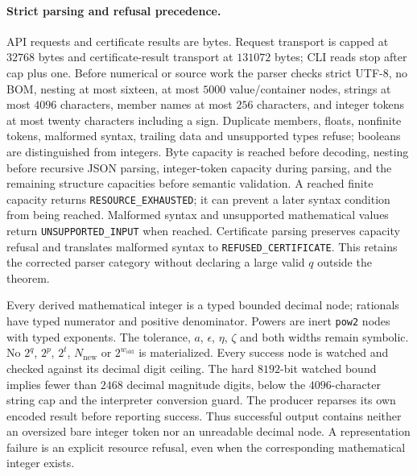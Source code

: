 \documentclass[11pt]{article}
\theoremstyle{plain}
\theoremstyle{definition}
\theoremstyle{remark}
\begin{document}
\paragraph{Strict parsing and refusal precedence.}
API requests and certificate results are bytes. Request transport is capped
at $32768$ bytes and certificate-result transport at $131072$ bytes; CLI
reads stop after cap plus one. Before numerical or source work the parser
checks strict UTF-8, no BOM, nesting at most sixteen, at most $5000$
value/container nodes, strings at most $4096$ characters, member names at
most $256$ characters, and integer tokens at most twenty characters including
a sign. Duplicate members, floats, nonfinite tokens, malformed syntax,
trailing data and unsupported types refuse; booleans are distinguished from
integers. Byte capacity is reached before decoding, nesting before recursive
JSON parsing, integer-token capacity during parsing, and the remaining
structure capacities before semantic validation. A reached finite capacity
returns \texttt{RESOURCE\_EXHAUSTED}; it can prevent a later syntax condition
from being reached. Malformed syntax and unsupported mathematical values
return \texttt{UNSUPPORTED\_INPUT} when reached. Certificate parsing preserves
capacity refusal and translates malformed syntax to
\texttt{REFUSED\_CERTIFICATE}. This retains the corrected parser category
without declaring a large valid $q$ outside the theorem.

Every derived mathematical integer is a typed bounded decimal node;
rationals have typed numerator and positive denominator. Powers are inert
\texttt{pow2} nodes with typed exponents. The tolerance, $a$, $\epsilon$,
$\eta$, $\zeta$ and both widths remain symbolic. No $2^q$, $2^p$, $2^t$,
$N_{\mathrm{new}}$ or $2^{w_{\mathrm{old}}}$ is materialized. Every success
node is watched and checked against its decimal digit ceiling. The hard
$8192$-bit watched bound implies fewer than $2468$ decimal magnitude digits,
below the $4096$-character string cap and the interpreter conversion guard.
The producer reparses its own encoded result before reporting success.
Thus successful output contains neither an oversized bare integer token nor
an unreadable decimal node. A representation failure is an explicit resource
refusal, even when the corresponding mathematical integer exists.

\end{document}
